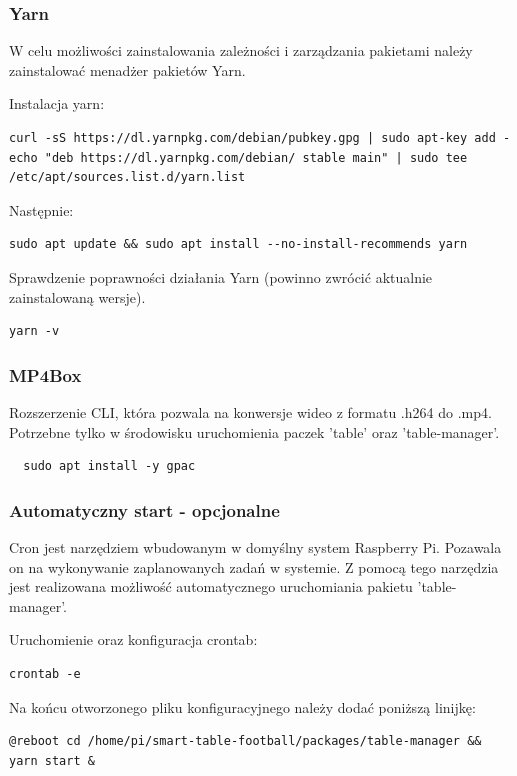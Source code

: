 \subsubsection{Yarn}
W celu możliwości zainstalowania zależności i zarządzania pakietami należy zainstalować menadżer pakietów Yarn.

Instalacja yarn:
\begin{lstlisting}[breaklines=true]
curl -sS https://dl.yarnpkg.com/debian/pubkey.gpg | sudo apt-key add -echo "deb https://dl.yarnpkg.com/debian/ stable main" | sudo tee /etc/apt/sources.list.d/yarn.list
\end{lstlisting}

Następnie:
\begin{lstlisting}[breaklines=true]
sudo apt update && sudo apt install --no-install-recommends yarn
\end{lstlisting}

Sprawdzenie poprawności działania Yarn (powinno zwrócić aktualnie zainstalowaną wersje).
\begin{lstlisting}
yarn -v
\end{lstlisting}


\subsubsection{MP4Box}
Rozszerzenie CLI, która pozwala na konwersje wideo z formatu .h264 do .mp4. Potrzebne tylko w środowisku uruchomienia paczek 'table' oraz 'table-manager'.

\begin{lstlisting}
  sudo apt install -y gpac
\end{lstlisting}


\subsubsection{Automatyczny start - opcjonalne}
Cron jest narzędziem wbudowanym w domyślny system Raspberry Pi. Pozawala on na wykonywanie zaplanowanych zadań w systemie. Z pomocą tego narzędzia jest realizowana możliwość automatycznego uruchomiania pakietu 'table-manager'. \cite{RaspCronDocs}

Uruchomienie oraz konfiguracja crontab:
\begin{lstlisting}
crontab -e
\end{lstlisting}

Na końcu otworzonego pliku konfiguracyjnego należy dodać poniższą linijkę:
\begin{lstlisting}[breaklines=true]
@reboot cd /home/pi/smart-table-football/packages/table-manager && yarn start &
\end{lstlisting}

